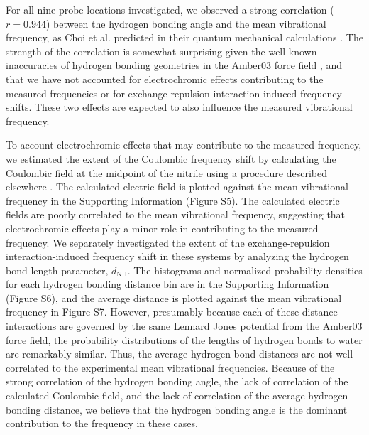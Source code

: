 For all nine probe locations investigated, we observed a strong correlation ($r = 0.944$) between the hydrogen bonding angle and the mean vibrational frequency, as Choi et al. predicted in their quantum mechanical calculations \cite{Choi2008}.
The strength of the correlation is somewhat surprising given the well-known inaccuracies of hydrogen bonding geometries in the Amber03 force field \cite{Paton2009}, and that we have not accounted for electrochromic effects contributing to the measured frequencies or for exchange-repulsion interaction-induced frequency shifts.
These two effects are expected to also influence the measured vibrational frequency.  

To account electrochromic effects that may contribute to the measured frequency, we estimated the extent of the Coulombic frequency shift by calculating the Coulombic field at the midpoint of the nitrile using a procedure described elsewhere \cite{Ensign2011}.
The calculated electric field is plotted against the mean vibrational frequency in the Supporting Information (Figure S5).
The calculated electric fields are poorly correlated to the mean vibrational frequency, suggesting that electrochromic effects play a minor role in contributing to the measured frequency.
We separately investigated the extent of the exchange-repulsion interaction-induced frequency shift in these systems by analyzing the hydrogen bond length parameter, $d_{\text{NH}}$.
The histograms and normalized probability densities for each hydrogen bonding distance bin are in the Supporting Information (Figure S6), and the average distance is plotted against the mean vibrational frequency in Figure S7.
However, presumably because each of these distance interactions are governed by the same Lennard Jones potential from the Amber03 force field, the probability distributions of the lengths of hydrogen bonds to water are remarkably similar.
Thus, the average hydrogen bond distances are not well correlated to the experimental mean vibrational frequencies.
Because of the strong correlation of the hydrogen bonding angle, the lack of correlation of the calculated Coulombic field, and the lack of correlation of the average hydrogen bonding distance, we believe that the hydrogen bonding angle is the dominant contribution to the frequency in these cases.

